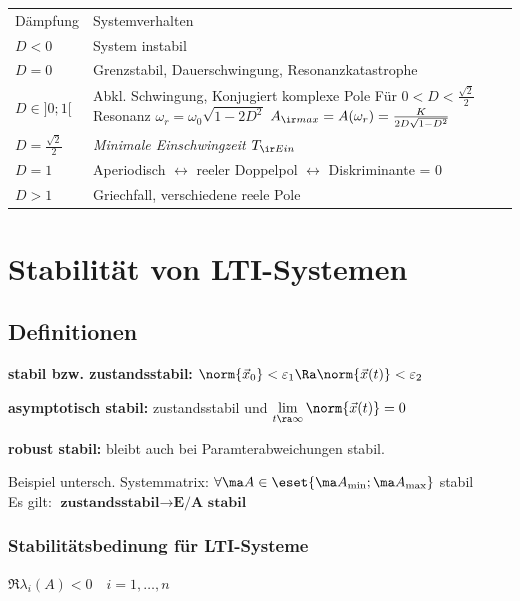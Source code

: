 \documentclass[german]{latex4ei/latex4ei_sheet}
\begin{document}
\begin{sectionbox}
\begin{tabular}{@{}p{1cm}l}
Dämpfung & Systemverhalten\\ \mrule
$D < 0$ & System instabil\\
$D = 0$ & Grenzstabil, Dauerschwingung, Resonanzkatastrophe\\[0.5em]
\parbox{1cm}{$D \in ]0;1[$ \vspace{0.7cm}} & \parbox{5cm}{Abkl. Schwingung, Konjugiert komplexe Pole\\
	Für $0 < D < \frac{\sqrt{2}}{2}$ Resonanz $\omega_r = \omega_0 \sqrt{1-2D^2}$\\
	$A_{\ir max} = A(\omega_r) = \frac{K}{2D\sqrt{1-D^2}}$ }\\
$D = \frac{\sqrt{2}}{2}$ & \emph{Minimale Einschwingzeit $T_{\ir Ein}$}\\
$D = 1$ & Aperiodisch $\leftrightarrow$ reeler Doppelpol $\leftrightarrow$ Diskriminante = 0\\
$D > 1$ & Griechfall, verschiedene reele Pole\\
\end{tabular}
\end{sectionbox}




\section{Stabilität von LTI-Systemen}
\begin{sectionbox}
\subsection{Definitionen}
\textbf{stabil bzw. zustandsstabil:} $\norm{ \vec x_0 } < \varepsilon_1 \Ra \norm{ \vec x(t) } < \varepsilon_2$

\textbf{asymptotisch stabil:} zustandsstabil und $\lim\limits_{t \ra \infty} \norm{\vec x(t)} = 0$

\textbf{robust stabil:} bleibt auch bei Paramterabweichungen stabil.

Beispiel untersch. Systemmatrix: $\forall \ma A \in \eset{\ma A_{\min}; \ma A_{\max}}$ stabil \\
Es gilt: $\textbf{zustandsstabil} \rightarrow \textbf{E/A stabil}$
\end{sectionbox}

\begin{sectionbox}
\subsubsection{Stabilitätsbedinung für LTI-Systeme}
\begin{emphbox}$\Re{\lambda_i (A)} < 0 \quad i = 1, \ldots, n$\end{emphbox}
\end{sectionbox}
\end{document}
